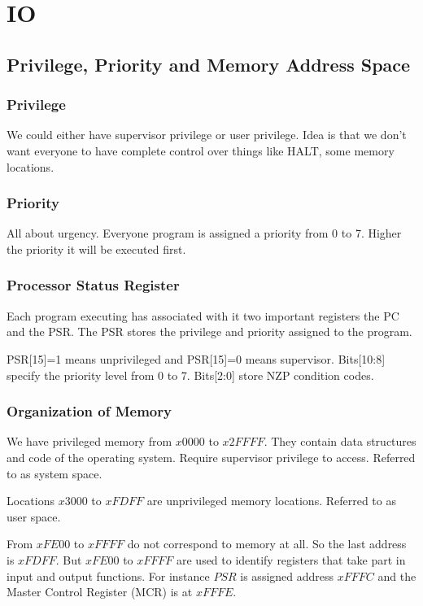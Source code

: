 \chapter{IO}

\section{Privilege, Priority and Memory Address Space}
\subsection{Privilege}
We could either have supervisor privilege or user privilege. Idea is that we don't want everyone to have complete control over things like HALT, some memory locations. 

\subsection{Priority}
All about urgency. Everyone program is assigned a priority from 0 to 7. Higher the priority it will be executed first. 


\subsection{Processor Status Register}
Each program executing has associated with it two important registers the PC and the PSR. The PSR stores the privilege and priority assigned to the program.

PSR[15]=1 means unprivileged and PSR[15]=0 means supervisor. Bits[10:8] specify the priority level from 0 to 7. Bits[2:0] store NZP condition codes.



\subsection{Organization of Memory}
We have privileged memory from $x0000$ to  $x2FFFF$.  They contain data structures and code of the operating system. Require supervisor privilege to access. Referred to as system space.

Locations $x3000$ to  $xFDFF$ are unprivileged memory locations. Referred to as user space.

From  $xFE00$ to $xFFFF$ do not correspond to memory at all. So the last address is $xFDFF$. But  $xFE00$ to  $xFFFF$ are used to identify registers that take part in input and output functions. For instance  $PSR$ is assigned address $xFFFC$ and the Master Control Register (MCR) is at  $xFFFE$. 


